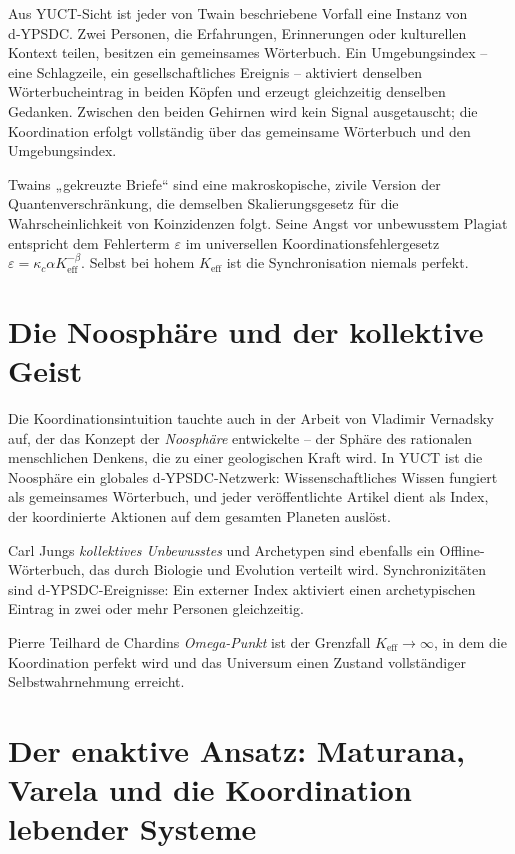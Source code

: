 \documentclass[12pt,a4paper]{article}
\begin{document}
	Aus YUCT-Sicht ist jeder von Twain beschriebene Vorfall eine Instanz von d‑YPSDC. Zwei Personen, die Erfahrungen, Erinnerungen oder kulturellen Kontext teilen, besitzen ein gemeinsames Wörterbuch. Ein Umgebungsindex – eine Schlagzeile, ein gesellschaftliches Ereignis – aktiviert denselben Wörterbucheintrag in beiden Köpfen und erzeugt gleichzeitig denselben Gedanken. Zwischen den beiden Gehirnen wird kein Signal ausgetauscht; die Koordination erfolgt vollständig über das gemeinsame Wörterbuch und den Umgebungsindex.
	
	Twains „gekreuzte Briefe“ sind eine makroskopische, zivile Version der Quantenverschränkung, die demselben Skalierungsgesetz für die Wahrscheinlichkeit von Koinzidenzen folgt. Seine Angst vor unbewusstem Plagiat entspricht dem Fehlerterm \(\varepsilon\) im universellen Koordinationsfehlergesetz \(\varepsilon = \kappa_c \alpha K_{\mathrm{eff}}^{-\beta}\). Selbst bei hohem \(K_{\mathrm{eff}}\) ist die Synchronisation niemals perfekt.
	
	\section{Die Noosphäre und der kollektive Geist}
	
	Die Koordinationsintuition tauchte auch in der Arbeit von Vladimir Vernadsky auf, der das Konzept der \emph{Noosphäre} entwickelte – der Sphäre des rationalen menschlichen Denkens, die zu einer geologischen Kraft wird. In YUCT ist die Noosphäre ein globales d‑YPSDC-Netzwerk: Wissenschaftliches Wissen fungiert als gemeinsames Wörterbuch, und jeder veröffentlichte Artikel dient als Index, der koordinierte Aktionen auf dem gesamten Planeten auslöst.
	
	Carl Jungs \emph{kollektives Unbewusstes} und Archetypen sind ebenfalls ein Offline-Wörterbuch, das durch Biologie und Evolution verteilt wird. Synchronizitäten sind d‑YPSDC-Ereignisse: Ein externer Index aktiviert einen archetypischen Eintrag in zwei oder mehr Personen gleichzeitig.
	
	Pierre Teilhard de Chardins \emph{Omega-Punkt} ist der Grenzfall \(K_{\mathrm{eff}} \to \infty\), in dem die Koordination perfekt wird und das Universum einen Zustand vollständiger Selbstwahrnehmung erreicht.
	
	\section{Der enaktive Ansatz: Maturana, Varela und die Koordination lebender Systeme}
	
\end{document}
